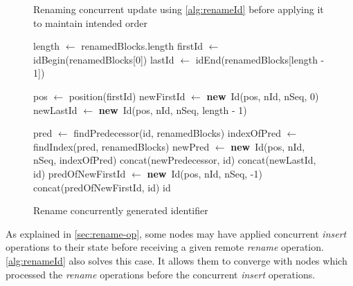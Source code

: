 \documentclass[10pt,journal,compsoc]{IEEEtran}
\let\MYoriglatexcaption\caption
\renewcommand{\caption}[2][\relax]{\MYoriglatexcaption[#2]{#2}}
\newcommand{\new}{\textbf{new}}
\newcommand{\trm}[1]{\mathit{#1}}
\begin{document}
\begin{figure}[t!]
\begin{tikzpicture}
    \end{tikzpicture}
    \caption{Renaming concurrent update using \autoref{alg:renameId} before applying it to maintain intended order}
    \label{fig:concurrent-insert-rename-fixed}
\end{figure}

\begin{figure}
    \begin{algorithmic}


            \State length $\gets$ renamedBlocks.length
            \State firstId $\gets$ idBegin(renamedBlocks[0])
            \State lastId $\gets$ idEnd(renamedBlocks[length - 1])

            \State pos $\gets$ position(firstId)
            \State newFirstId $\gets$ \new~Id(pos, nId, nSeq, 0)
            \State newLastId $\gets$ \new~Id(pos, nId, nSeq, length - 1)

                \State pred $\gets$ findPredecessor(id, renamedBlocks)
                \State indexOfPred $\gets$ findIndex(pred, renamedBlocks)
                \State newPred $\gets$ \new~Id(pos, nId, nSeq, indexOfPred)
                \State \Return concat(newPredecessor, id)
                \State \Return concat(newLastId, id)
                \State predOfNewFirstId $\gets$ \new~Id(pos, nId, nSeq, -1)
                \State \Return concat(predOfNewFirstId, id)
            \Else
                \State \Return id 
            \EndIf
        \EndFunction
    \end{algorithmic}
    \caption{Rename concurrently generated identifier}
    \label{alg:renameId}
\end{figure}

As explained in \autoref{sec:rename-op}, some nodes may have applied concurrent \emph{insert} operations to their state before receiving a given remote \emph{rename} operation.
\autoref{alg:renameId} also solves this case.
It allows them to converge with nodes which processed the \emph{rename} operations before the concurrent \emph{insert} operations.
\end{document}
